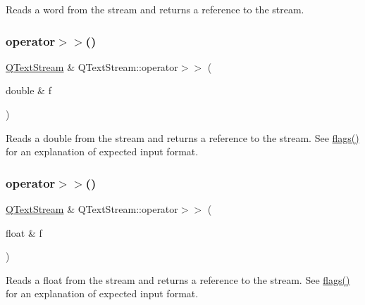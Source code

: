 Reads a word from the stream and returns a reference to the stream. \mbox{\label{class_q_text_stream_a7c671bbb530d2187da84d51141b540cd}} 
\subsubsection{\texorpdfstring{operator$>$$>$()}{operator>>()}\hspace{0.1cm}{\footnotesize\ttfamily [3/13]}}
{\footnotesize\ttfamily \mbox{\hyperlink{class_q_text_stream}{Q\+Text\+Stream}} \& Q\+Text\+Stream\+::operator$>$$>$ (\begin{DoxyParamCaption}\item[{double \&}]{f }\end{DoxyParamCaption})}

Reads a {\ttfamily double} from the stream and returns a reference to the stream. See \mbox{\hyperlink{class_q_text_stream_ab6cf395446ba04973dff067ab8b36978}{flags()}} for an explanation of expected input format. \mbox{\label{class_q_text_stream_abd9ed695feef50e0dc72f0f366b5a4d8}} 
\subsubsection{\texorpdfstring{operator$>$$>$()}{operator>>()}\hspace{0.1cm}{\footnotesize\ttfamily [4/13]}}
{\footnotesize\ttfamily \mbox{\hyperlink{class_q_text_stream}{Q\+Text\+Stream}} \& Q\+Text\+Stream\+::operator$>$$>$ (\begin{DoxyParamCaption}\item[{float \&}]{f }\end{DoxyParamCaption})}

Reads a {\ttfamily float} from the stream and returns a reference to the stream. See \mbox{\hyperlink{class_q_text_stream_ab6cf395446ba04973dff067ab8b36978}{flags()}} for an explanation of expected input format. \mbox{\label{class_q_text_stream_a4d06cd74325e6420974f01156bdfc52a}} 
